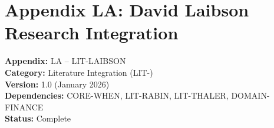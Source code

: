 
\chapter*{Appendix LA: David Laibson Research Integration}
\label{app:laibson}

\begin{tcolorbox}[colback=white,colframe=black!75!white,title=Appendix Metadata]
\textbf{Appendix:} LA -- LIT-LAIBSON \\
\textbf{Category:} Literature Integration (LIT-) \\
\textbf{Version:} 1.0 (January 2026) \\
\textbf{Dependencies:} CORE-WHEN, LIT-RABIN, LIT-THALER, DOMAIN-FINANCE \\
\textbf{Status:} Complete
\end{tcolorbox}


